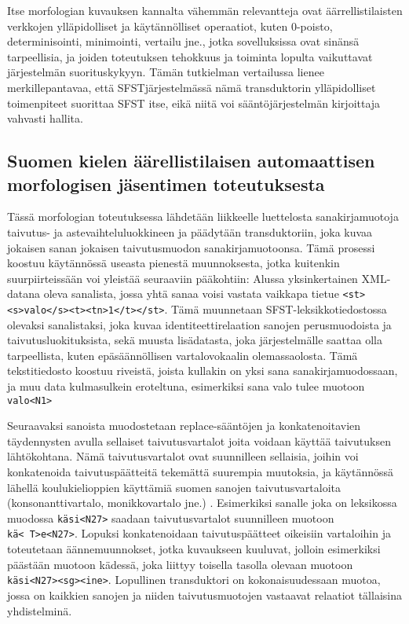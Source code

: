\documentclass[free]{flammie}
\begin{document}
Itse morfologian kuvauksen kannalta vähemmän relevantteja ovat
äärrellistilaisten verkkojen ylläpidolliset ja käytännölliset operaatiot, kuten
0-poisto, determinisointi, minimointi, vertailu jne., jotka sovelluksissa ovat sinänsä tarpeellisia,
ja joiden toteutuksen tehokkuus ja toiminta lopulta vaikuttavat järjestelmän suorituskykyyn. Tämän tutkielman vertailussa lienee merkillepantavaa, että SFSTjärjestelmässä nämä transduktorin ylläpidolliset toimenpiteet suorittaa SFST itse,
eikä niitä voi sääntöjärjestelmän kirjoittaja vahvasti hallita.


\subsection{Suomen kielen äärellistilaisen automaattisen morfologisen
jäsentimen toteutuksesta}

Tässä morfologian toteutuksessa lähdetään liikkeelle luettelosta
sanakirjamuotoja taivutus- ja astevaihteluluokkineen ja päädytään
transduktoriin, joka kuvaa jokaisen sanan jokaisen taivutusmuodon
sanakirjamuotoonsa. Tämä prosessi koostuu käytännössä useasta pienestä
muunnoksesta, jotka kuitenkin suurpiirteissään voi yleistää seuraaviin
pääkohtiin: Alussa yksinkertainen XML-datana oleva sanalista, jossa yhtä sanaa
voisi vastata vaikkapa tietue \texttt{<st><s>valo</s><t><tn>1</t></st>}. Tämä
muunnetaan SFST-leksikkotiedostossa olevaksi sanalistaksi, joka kuvaa identiteettirelaation sanojen
perusmuodoista ja taivutusluokituksista, sekä muusta lisädatasta, joka järjestelmälle saattaa olla tarpeellista, kuten epäsäännöllisen vartalovokaalin olemassaolosta. Tämä tekstitiedosto koostuu riveistä, joista kullakin on yksi sana sanakirjamuodossaan, ja muu data kulmasulkein eroteltuna, esimerkiksi sana valo tulee
muotoon \texttt{valo<N1>}

Seuraavaksi sanoista muodostetaan replace-sääntöjen ja konkatenoitavien täydennysten avulla sellaiset taivutusvartalot joita voidaan käyttää taivutuksen lähtökohtana. Nämä taivutusvartalot ovat suunnilleen sellaisia, joihin voi konkatenoida
taivutuspäätteitä tekemättä suurempia muutoksia, ja käytännössä lähellä
koulukielioppien käyttämiä suomen sanojen taivutusvartaloita
(konsonanttivartalo, monikkovartalo jne.) \cite{setala1930suomen}. Esimerkiksi sanalle
joka on leksikossa muodossa \texttt{käsi<N27>} saadaan taivutusvartalot
suunnilleen muotoon \texttt{kä<~T>e<N27>}.
Lopuksi konkatenoidaan taivutuspäätteet oikeisiin vartaloihin ja toteutetaan äännemuunnokset, jotka kuvaukseen kuuluvat, jolloin esimerkiksi päästään muotoon
kädessä, joka liittyy toisella tasolla olevaan muotoon
\texttt{käsi<N27><sg><ine>}.
Lopullinen transduktori on kokonaisuudessaan muotoa, jossa on kaikkien sanojen
ja niiden taivutusmuotojen vastaavat relaatiot tällaisina yhdistelminä.
\end{document}
